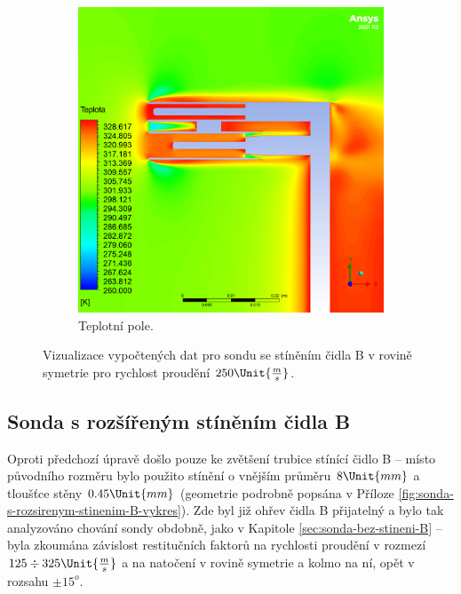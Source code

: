\begin{figure}[ht!]
\begin{subfigure}{0.45\textwidth}
                \includegraphics[width=\textwidth]{400_SIMULACE_KONSTRUKCNICH_UPRAV/Vizualizace/sonda_se_stinenim_B_vizualizace_teplota.png}
                \caption{Teplotní pole.}
            \end{subfigure}
            \caption{Vizualizace vypočtených dat pro sondu se stíněním čidla B v rovině symetrie pro rychlost proudění $250 \Unit{\frac{m}{s}}$.}
            \label{fig:sonda-se-stinenim-B-vizualizace}
        \end{figure}
    
    \newpage
    \subsection{Sonda s rozšířeným stíněním čidla B} \label{sec:sonda-s-rozsirenym-stinenim-B}
        Oproti předchozí úpravě došlo pouze ke zvětšení trubice stínící čidlo B – místo původního rozměru bylo použito stínění o vnějším průměru $8 \Unit{mm}$ a tloušťce stěny $0.45 \Unit{mm}$ (geometrie podrobně popsána v Příloze \ref{fig:sonda-s-rozsirenym-stinenim-B-vykres}). Zde byl již ohřev čidla B přijatelný a bylo tak analyzováno chování sondy obdobně, jako v Kapitole \ref{sec:sonda-bez-stineni-B} – byla zkoumána závislost restitučních faktorů na rychlosti proudění v rozmezí $125 \div 325 \Unit{\frac{m}{s}}$ a na natočení v rovině symetrie a kolmo na ní, opět v rozsahu $\pm 15^o$.
        
